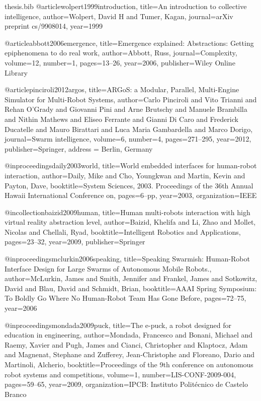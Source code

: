 \documentclass[oneside, a4paper, 12pt]{memoir}
\begin{document}
\begin{filecontents}{thesis.bib}
@article{wolpert1999introduction,
  title={An introduction to collective intelligence},
  author={Wolpert, David H and Tumer, Kagan},
  journal={arXiv preprint cs/9908014},
  year={1999}
}

@article{abbott2006emergence,
  title={Emergence explained: Abstractions: Getting epiphenomena to do real work},
  author={Abbott, Russ},
  journal={Complexity},
  volume={12},
  number={1},
  pages={13--26},
  year={2006},
  publisher={Wiley Online Library}
}

@article{pinciroli2012argos,
  title={{ARGoS}: a Modular, Parallel, Multi-Engine Simulator for Multi-Robot Systems},
  author={Carlo Pinciroli and Vito Trianni and Rehan O'Grady and Giovanni Pini and Arne Brutschy and Manuele Brambilla and Nithin Mathews and Eliseo Ferrante and Gianni {Di Caro} and Frederick Ducatelle and Mauro Birattari and Luca Maria Gambardella and Marco Dorigo},
  journal={Swarm intelligence},
  volume={6},
  number={4},
  pages={271--295},
  year={2012},
  publisher={Springer},
  address = {Berlin, Germany}
}

@inproceedings{daily2003world,
  title={World embedded interfaces for human-robot interaction},
  author={Daily, Mike and Cho, Youngkwan and Martin, Kevin and Payton, Dave},
  booktitle={System Sciences, 2003. Proceedings of the 36th Annual Hawaii International Conference on},
  pages={6--pp},
  year={2003},
  organization={IEEE}
}

@incollection{baizid2009human,
  title={Human multi-robots interaction with high virtual reality abstraction level},
  author={Baizid, Khelifa and Li, Zhao and Mollet, Nicolas and Chellali, Ryad},
  booktitle={Intelligent Robotics and Applications},
  pages={23--32},
  year={2009},
  publisher={Springer}
}

@inproceedings{mclurkin2006speaking,
  title={Speaking Swarmish: Human-Robot Interface Design for Large Swarms of Autonomous Mobile Robots.},
  author={McLurkin, James and Smith, Jennifer and Frankel, James and Sotkowitz, David and Blau, David and Schmidt, Brian},
  booktitle={AAAI Spring Symposium: To Boldly Go Where No Human-Robot Team Has Gone Before},
  pages={72--75},
  year={2006}
}

@inproceedings{mondada2009puck,
  title={The e-puck, a robot designed for education in engineering},
  author={Mondada, Francesco and Bonani, Michael and Raemy, Xavier and Pugh, James and Cianci, Christopher and Klaptocz, Adam and Magnenat, Stephane and Zufferey, Jean-Christophe and Floreano, Dario and Martinoli, Alcherio},
  booktitle={Proceedings of the 9th conference on autonomous robot systems and competitions},
  volume={1},
  number={LIS-CONF-2009-004},
  pages={59--65},
  year={2009},
  organization={IPCB: Instituto Polit{\'e}cnico de Castelo Branco}
}


\end{filecontents}
\end{document}
